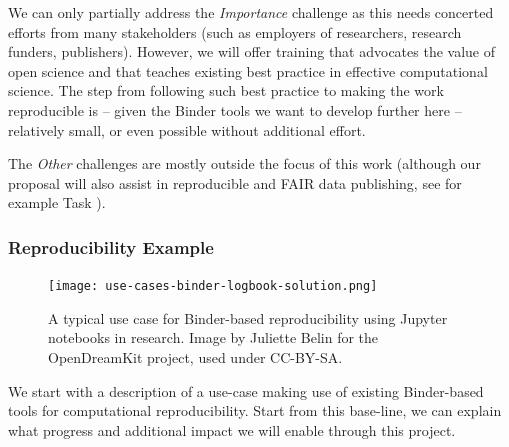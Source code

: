 We can only partially address the \emph{Importance} challenge as this needs
concerted efforts from many stakeholders (such as employers of researchers,
research funders, publishers). However, we will offer training that advocates
the value of open science and that teaches existing best practice in
effective computational science. The step from following such best practice to
making the work reproducible is -- given the Binder tools we want to develop
further here -- relatively small, or even possible without additional effort.

The \emph{Other} challenges are mostly outside the focus of this work
(although our proposal will also assist in reproducible and FAIR data
publishing, see for example Task ).



\subsubsection{Reproducibility Example}
\label{sec:reproducibility-example} 

\begin{figure}[htb]\centering
  \texttt{[image: use-cases-binder-logbook-solution.png]}
  \caption{A typical use case for Binder-based reproducibility using Jupyter notebooks in research.
            Image by Juliette Belin for the OpenDreamKit project, used under
            CC-BY-SA.}\label{fig:use-cases-binder}
\end{figure}

We start with a description of a use-case making use of existing Binder-based
tools for computational reproducibility. Start from this base-line, we can
explain what progress and additional impact we will enable through this project.

